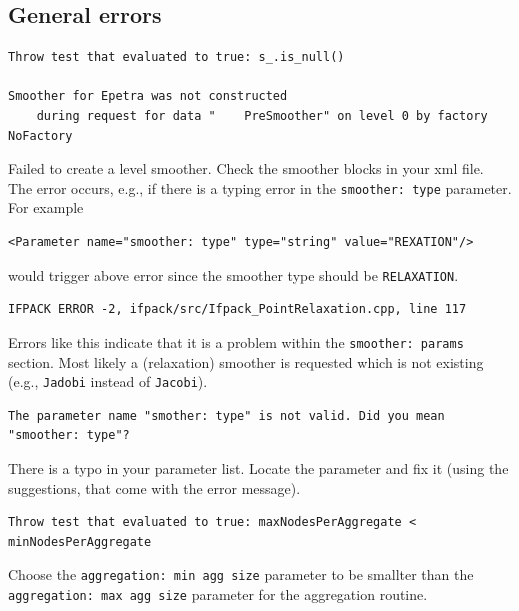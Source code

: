 \documentclass[10pt,fleqn]{book}
\begin{document}
\subsection{General errors}

\begin{cBox}
\begin{lstlisting}
Throw test that evaluated to true: s_.is_null()

Smoother for Epetra was not constructed
    during request for data "    PreSmoother" on level 0 by factory NoFactory
\end{lstlisting}
\end{cBox}
Failed to create a level smoother. Check the smoother blocks in your xml file.
The error occurs, e.g., if there is a typing error in the \verb|smoother: type| parameter.
For example
\begin{lstlisting}
<Parameter name="smoother: type" type="string" value="REXATION"/>
\end{lstlisting}
would trigger above error since the smoother type should be \verb|RELAXATION|.

\begin{cBox}
\begin{lstlisting}
IFPACK ERROR -2, ifpack/src/Ifpack_PointRelaxation.cpp, line 117
\end{lstlisting}
\end{cBox}
Errors like this indicate that it is a problem within the \verb|smoother: params| section. Most likely a (relaxation) smoother is requested which is not existing (e.g., \verb|Jadobi| instead of \verb|Jacobi|).

\begin{cBox}
\begin{lstlisting}
The parameter name "smother: type" is not valid. Did you mean "smoother: type"?
\end{lstlisting}
\end{cBox}
There is a typo in your parameter list. Locate the parameter and fix it (using the suggestions, that come with the error message).

\begin{cBox}
\begin{lstlisting}
Throw test that evaluated to true: maxNodesPerAggregate < minNodesPerAggregate
\end{lstlisting}
\end{cBox}
Choose the \verb|aggregation: min agg size| parameter to be smallter than the \verb|aggregation: max agg size| parameter for the aggregation routine.
\end{document}
